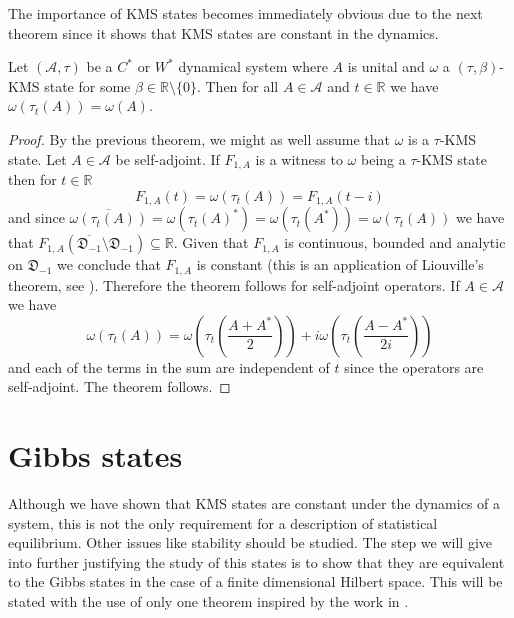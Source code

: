 The importance of KMS states becomes immediately obvious due to the next theorem since it shows that KMS states are constant in the dynamics.

\begin{theorem}\label{thm:time_invariance}
Let $(\mathcal{A},\tau)$ be a $C^*$ or $W^*$ dynamical system where $A$ is unital and $\omega$ a $(\tau,\beta)$-KMS state for some $\beta\in\mathbb{R}\setminus\{0\}$. Then for all $A\in\mathcal{A}$ and $t\in\mathbb{R}$ we have $\omega(\tau_t(A))=\omega(A)$.
\end{theorem}

\begin{proof}
By the previous theorem, we might as well assume that $\omega$ is a $\tau$-KMS state. Let $A\in\mathcal{A}$ be self-adjoint. If $F_{1,A}$ is a witness to $\omega$ being a $\tau$-KMS state then for $t\in\mathbb{R}$
\begin{equation}
F_{1,A}(t)=\omega(\tau_t(A))=F_{1,A}(t-i)
\end{equation}
and since $\overline{\omega(\tau_t(A))}=\omega(\tau_t(A)^*)=\omega(\tau_t(A^*))=\omega(\tau_t(A))$ we have that $F_{1,A}(\overline{\mathfrak{D}_{-1}}\setminus\mathfrak{D}_{-1})\subseteq\mathbb{R}$. Given that $F_{1,A}$ is continuous, bounded and analytic on $\mathfrak{D}_{-1}$ we conclude that $F_{1,A}$ is constant (this is an application of Liouville's theorem, see \cite{Duvenhage1999}). Therefore the theorem follows for self-adjoint operators.
If $A\in\mathcal{A}$ we have
\begin{equation}
\omega(\tau_t(A))=\omega\left(\tau_t\left(\frac{A+A^*}{2}\right)\right)+i\omega\left(\tau_t\left(\frac{A-A^*}{2i}\right)\right)
\end{equation}
and each of the terms in the sum are independent of $t$ since the operators are self-adjoint. The theorem follows.
\end{proof}

\section{Gibbs states}

Although we have shown that KMS states are constant under the dynamics of a system, this is not the only requirement for a description of statistical equilibrium. Other issues like stability should be studied. The step we will give into further justifying the study of this states is to show that they are equivalent to the Gibbs states in the case of a finite dimensional Hilbert space. This will be stated with the use of only one theorem inspired by the work in \cite{Duvenhage1999}.

